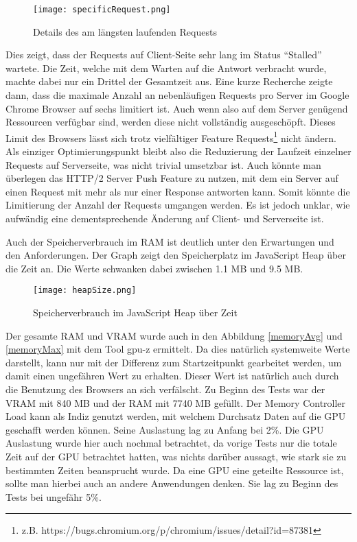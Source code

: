 \begin{figure}[H]
  \centering
  \texttt{[image: specificRequest.png]}
  \caption{Details des am längsten laufenden Requests}
  \label{specificRequest}
\end{figure}

Dies zeigt, dass der Requests auf Client-Seite sehr lang im Status “Stalled” wartete. Die Zeit, welche mit dem Warten auf die Antwort verbracht wurde, machte dabei nur ein Drittel der Gesamtzeit aus. Eine kurze Recherche zeigte dann, dass die maximale Anzahl an nebenläufigen Requests pro Server im Google Chrome Browser auf sechs limitiert ist. Auch wenn also auf dem Server genügend Ressourcen verfügbar sind, werden diese nicht vollständig ausgeschöpft. Dieses Limit des Browsers lässt sich trotz vielfältiger Feature Requests\footnote{z.B. https://bugs.chromium.org/p/chromium/issues/detail?id=87381} nicht ändern. Als einziger Optimierungspunkt bleibt also die Reduzierung der Laufzeit einzelner Requests auf Serverseite, was nicht trivial umsetzbar ist. Auch könnte man überlegen das HTTP/2 Server Push Feature zu nutzen, mit dem ein Server auf einen Request mit mehr als nur einer Response antworten kann. Somit könnte die Limitierung der Anzahl der Requests umgangen werden. Es ist jedoch unklar, wie aufwändig eine dementsprechende Änderung auf Client- und Serverseite ist.

Auch der Speicherverbrauch im RAM ist deutlich unter den Erwartungen und den Anforderungen. Der Graph zeigt den Speicherplatz im JavaScript Heap über die Zeit an. Die Werte schwanken dabei zwischen 1.1 MB und 9.5 MB.

\begin{figure}[H]
  \texttt{[image: heapSize.png]}
  \caption{Speicherverbrauch im JavaScript Heap über Zeit}
  \label{specificRequest}
\end{figure}

Der gesamte RAM und VRAM wurde auch in den Abbildung \ref{memoryAvg} und \ref{memoryMax} mit dem Tool gpu-z ermittelt. Da dies natürlich systemweite Werte darstellt, kann nur mit der Differenz zum Startzeitpunkt gearbeitet werden, um damit einen ungefähren Wert zu erhalten. Dieser Wert ist natürlich auch durch die Benutzung des Browsers an sich verfälscht. Zu Beginn des Tests war der VRAM mit 840 MB und der RAM mit 7740 MB gefüllt. Der Memory Controller Load kann als Indiz genutzt werden, mit welchem Durchsatz Daten auf die GPU geschafft werden können. Seine Auslastung lag zu Anfang bei 2\%. Die GPU Auslastung wurde hier auch nochmal betrachtet, da vorige Tests nur die totale Zeit auf der GPU betrachtet hatten, was nichts darüber aussagt, wie stark sie zu bestimmten Zeiten beansprucht wurde. Da eine GPU eine geteilte Ressource ist, sollte man hierbei auch an andere Anwendungen denken. Sie lag zu Beginn des Tests bei ungefähr 5\%.

